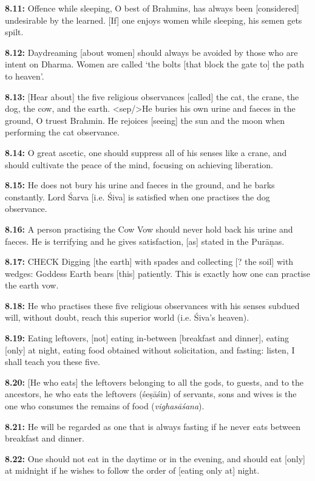 \documentclass{article}
\newcommand{\vsnum}[1]{\textbf{#1}}
\newcommand{\skt}[1]{\textit{#1}}
\begin{document}
\vsnum{8.11: }Offence while sleeping, O best of Brahmins, has always been [considered] undesirable by the learned. [If] one enjoys women while sleeping, his semen gets spilt.

\vsnum{8.12: }Daydreaming [about women] should always be avoided by those who are intent on Dharma. Women are called `the bolts [that block the gate to] the path to heaven'.

\vsnum{8.13: }[Hear about] the five religious observances [called] the cat, the crane, the dog, the cow, and the earth. <sep/>He buries his own urine and faeces in the ground, O truest Brahmin. He rejoices [seeing] the sun and the moon when performing the cat observance.

\vsnum{8.14: }O great ascetic, one should suppress all of his senses like a crane, and should cultivate the peace of the mind, focusing on achieving liberation.

\vsnum{8.15: }He does not bury his urine and faeces in the ground, and he barks constantly. Lord Śarva [i.e. Śiva] is satisfied when one practises the dog observance.

\vsnum{8.16: }A person practising the Cow Vow should never hold back his urine and faeces. He is terrifying and he gives satisfaction, [as] stated in the Purāṇas.

\vsnum{8.17: }CHECK Digging [the earth] with spades and collecting [? the soil] with wedges: Goddess Earth bears [this] patiently. This is exactly how one can practise the earth vow.

\vsnum{8.18: }He who practises these five religious observances with his senses subdued will, without doubt, reach this superior world (i.e. Śiva's heaven).

\vsnum{8.19: }Eating leftovers, [not] eating in-between [breakfast and dinner], eating [only] at night, eating food obtained without solicitation, and fasting: listen, I shall teach you these five.

\vsnum{8.20: }[He who eats] the leftovers belonging to all the gods, to guests, and to the ancestors, he who eats the leftovers (śeṣāśin) of servants, sons and wives is the one who consumes the remains of food (\skt{vighasāśana}).

\vsnum{8.21: }He will be regarded as one that is always fasting if he never eats between breakfast and dinner.

\vsnum{8.22: }One should not eat in the daytime or in the evening, and should eat [only] at midnight if he wishes to follow the order of [eating only at] night.
\end{document}
